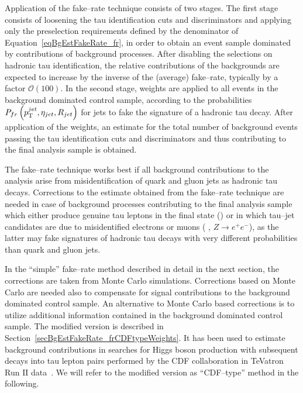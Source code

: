 Application of the fake--rate technique consists of two stages.  The first stage
consists of loosening the tau identification cuts and discriminators and
applying only the preselection requirements defined by the denominator of
Equation~\ref{eqBgEstFakeRate_fr}, in order to obtain an event sample dominated
by contributions of background processes. After disabling the selections on
hadronic tau identification, the relative contributions of the backgrounds are
expected to increase by the inverse of the (average) fake--rate, typically by a
factor $\mathcal{O} \left( 100 \right)$.  In the second stage, weights are
applied to all events in the background dominated control sample, according to
the probabilities $P_{fr} \left( p_{\mathrm{T}}^{jet}, \eta_{jet}, R_{jet} \right)$ for
jets to fake the signature of a hadronic tau decay.  After application of the
weights, an estimate for the total number of background events passing the tau
identification cuts and discriminators and thus contributing to the final
analysis sample is obtained.

The fake--rate technique works best if all background contributions to the
analysis arise from misidentification of quark and gluon jets as hadronic tau
decays.  Corrections to the estimate obtained from the fake--rate technique  are
needed in case of background processes contributing to the final analysis sample
which either produce genuine tau leptons in the final state (\eg \ttbarpJets) or
in which tau--jet candidates are due to misidentified electrons or muons (\eg
\ZMM, $Z \to e^{+} e^{-}$), as the latter may fake signatures of hadronic tau
decays with very different probabilities than quark and gluon jets. 

In the ``simple'' fake--rate method described in detail in the next
section, the corrections are taken from Monte Carlo simulations.  Corrections
based on Monte Carlo are needed also to compensate for signal contributions to
the background dominated control sample.
An alternative to Monte Carlo based corrections is to utilize additional
information contained in the background dominated control sample.  The modified
version is described in Section~\ref{secBgEstFakeRate_frCDFtypeWeights}.  It has
been used to estimate background contributions in searches for Higgs boson
production with subsequent decays into tau lepton pairs performed by the CDF
collaboration in TeVatron Run $\mathrm{II}$ data~\cite{CDFMSSMHiggs,
CDFFakerateDJang, CDFrefPzeta}.  We will
refer to the modified version as ``CDF--type'' method in the following.

